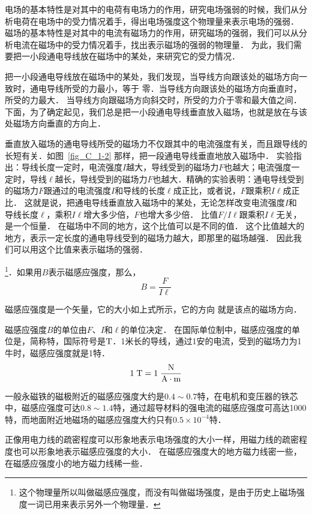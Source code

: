 电场的基本特性是对其中的电荷有电场力的作用，研究电场强弱的时候，我们从分析电荷在电场中的受力情况着手，得出电场强度这个物理量来表示电场的强弱．
磁场的基本特性是对其中的电流有磁场力的作用，研究磁场的强弱，我们可以从分析电流在磁场中的受力情况着手，找出表示磁场的强弱的物理量．
为此，我们需要把一小段通电导线放在磁场中的某处，来研究它的受力情况．

把一小段通电导线放在磁场中的某处，我们发现，当导线方向跟该处的磁场方向一致时，通电导线所受的力最小，等于
零．当导线方向跟该处的磁场方向垂直时，所受的力最大．
当导线方向跟磁场方向斜交时，所受的力介于零和最大值之间．下面，为了确定起见，我们总是把一小段通电导线垂直放入磁场，也就是放在与该处磁场方向垂直的方向上．

垂直放入磁场的通电导线所受的磁场力不仅跟其中的电流强度有关，而且跟导线的长短有关．如图~\ref{fig_C_1-2} 那样，把一段通电导线垂直地放入磁场中．
实验指出：导线长度一定时，电流强度$I$越大，导线受到的磁场力$F$也越大；电流强度一定时，导线$\ell$越长，导线受到的磁场力$F$也越大．精确的实验表明：通电导线受到的磁场力$F$跟通过的电流强度$I$和导线的长度$\ell$成正比，或者说，$F$跟乘积$I\ell$成正比．
这就是说，把通电导线垂直放入磁场中的某处，无论怎样改变电流强度$I$和
导线长度$\ell$，乘积$I\ell$增大多少倍，$F$也增大多少倍．
比值$F/I\ell$跟乘积$I\ell$无关，是一个恒量．
在磁场中不同的地方，这个比值可以是不同的值．
这个比值越大的地方，表示一定长度的通电导线受到的磁场力越大，即那里的磁场越强．
因此我们可以用这个比值来表示磁场的强弱．

\footnote{这个物理量所以叫做磁感应强度，而没有叫做磁场强度，是由于历史上磁场强度一词已用来表示另外一个物理量．}．如果用$B$表示磁感应强度，那么，
\[B=\frac{F}{I\ell}\]

磁感应强度是一个矢量，它的大小如上式所示，它的方向
就是该点的磁场方向．

磁感应强度$B$的单位由$F$、$I$和$\ell$的单位决定．
在国际单位制中，磁感应强度的单位是，简称特，国际符号是$ \text{T} $．1米长的导线，通过1安的电流，受到的磁场力为1牛时，磁感应强度就是1特．
\[1\;\text{T} =1 \; \frac{\text{N}}{\text{A}\cdot\text{m}}\]

一般永磁铁的磁极附近的磁感应强度大约是$0.4 \sim 0.7$特，在电机和变压器的铁芯中，磁感应强度可达$0.8 \sim 1.4$特，通过超导材料的强电流的磁感应强度可高达1000特，而地面附近地磁场的磁感应强度大约只有$0.5\times 10^{-4}$特．

正像用电力线的疏密程度可以形象地表示电场强度的大小一样，用磁力线的疏密程度也可以形象地表示磁感应强度的大小．
在磁感应强度大的地方磁力线密一些，在磁感应强度小的地方磁力线稀一些．

